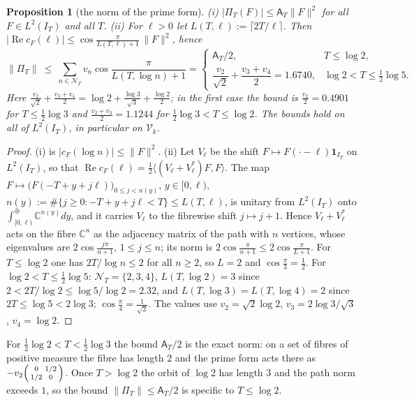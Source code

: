 \documentclass[10pt]{amsart}
\newtheorem{proposition}[theorem]{Proposition}
\theoremstyle{definition}
\theoremstyle{remark}
\newcommand{\C}{\mathbb C}
\newcommand{\Rel}{\operatorname{Re}}
\newcommand{\IT}{I_T}
\newcommand{\cF}{c_F}
\newcommand{\NT}{\mathcal N_T}
\newcommand{\Aconst}{\mathsf A_T}
\newcommand{\PiT}{\Pi_T}
\begin{document}
\begin{proposition}[the norm of the prime form]\label{prop:coer-prime}
\emph{(i)} $|\PiT(F)|\le\Aconst\|F\|^2$ for all $F\in L^2(\IT)$ and all $T$.
\emph{(ii)} For $\ell>0$ let $L(T,\ell):=\lceil2T/\ell\rceil$. Then $|\Rel\cF(\ell)|\le\cos\frac{\pi}{L(T,\ell)+1}\,\|F\|^2$,
hence
\[
\|\PiT\|\ \le\ \sum_{n\in\NT}v_n\cos\frac\pi{L(T,\log n)+1}
=\begin{cases}
\Aconst/2, & T\le\log2,\\[2pt]
\dfrac{v_2}{\sqrt2}+\dfrac{v_3+v_4}2=1.6740, & \log2<T\le\tfrac12\log5 .
\end{cases}
\]
Here $\frac{v_2}{\sqrt2}+\frac{v_3+v_4}2=\log2+\frac{\log3}{\sqrt3}+\frac{\log2}2$; in the first case the bound is
$\frac{v_2}2=0.4901$ for $T\le\frac12\log3$ and $\frac{v_2+v_3}2=1.1244$ for $\frac12\log3<T\le\log2$. The bounds hold on all of $L^2(\IT)$, in particular on $\mathcal V_k$.
\end{proposition}
\begin{proof}
(i) is $|\cF(\log n)|\le\|F\|^2$. (ii) Let $V_\ell$ be the shift $F\mapsto F(\cdot-\ell)\mathbf 1_{\IT}$ on
$L^2(\IT)$, so that $\Rel\cF(\ell)=\frac12\langle(V_\ell+V_\ell^*)F,F\rangle$. The map
$F\mapsto\big(F(-T+y+j\ell)\big)_{0\le j<n(y)}$, $y\in[0,\ell)$, $n(y):=\#\{j\ge0:-T+y+j\ell<T\}\le L(T,\ell)$, is unitary
from $L^2(\IT)$ onto $\int^\oplus_{[0,\ell)}\C^{n(y)}dy$, and it carries $V_\ell$ to the fibrewise shift $j\mapsto j+1$.
Hence $V_\ell+V_\ell^*$ acts on the fibre $\C^{n}$ as the adjacency matrix of the path with $n$ vertices, whose
eigenvalues are $2\cos\frac{j\pi}{n+1}$, $1\le j\le n$; its norm is $2\cos\frac\pi{n+1}\le2\cos\frac\pi{L+1}$. For
$T\le\log2$ one has $2T/\log n\le2$ for all $n\ge2$, so $L=2$ and $\cos\frac\pi3=\frac12$. For $\log2<T\le\frac12\log5$:
$\NT=\{2,3,4\}$, $L(T,\log2)=3$ since $2<2T/\log2\le\log5/\log2=2.32$, and $L(T,\log3)=L(T,\log4)=2$ since
$2T\le\log5<2\log3$; $\cos\frac\pi4=\frac1{\sqrt2}$. The values use $v_2=\sqrt2\log2$, $v_3=2\log3/\sqrt3$, $v_4=\log2$.
\end{proof}
For $\frac12\log2<T<\frac12\log3$ the bound $\Aconst/2$ is the exact norm: on a set of fibres of positive
measure the fibre has length $2$ and the prime form acts there as $-v_2\begin{psmallmatrix}0&1/2\\1/2&0\end{psmallmatrix}$.
Once $T>\log2$ the orbit of $\log2$ has length $3$ and the path norm exceeds $1$, so the bound
$\|\PiT\|\le\Aconst/2$ is specific to $T\le\log2$.
\end{document}
